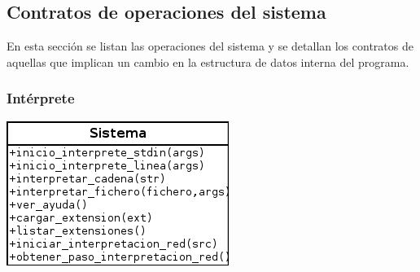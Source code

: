 \subsection{Contratos de operaciones del sistema}
En esta sección se listan las operaciones del sistema y se detallan los contratos de aquellas
que implican un cambio en la estructura de datos interna del programa. 

\subsubsection{Intérprete}
\begin{center}
\includegraphics[scale=0.7]{operaciones_sistema.png} \\
\end{center}
